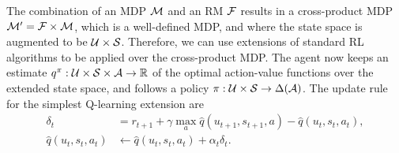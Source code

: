 The combination of an MDP $\mathcal{M}$ and an RM $\mathcal{F}$ results in a cross-product MDP $\mathcal{M}'=\mathcal{F}\times\mathcal{M}$, which is a well-defined MDP, and where the state space is augmented to be $\mathcal{U}\times\mathcal{S}$. Therefore, we can use extensions of standard RL algorithms to be applied over the cross-product MDP. The agent now keeps an estimate $q^\pi:\mathcal{U}\times\mathcal{S}\times\mathcal{A}\rightarrow\mathbb{R}$ of the optimal action-value functions over the extended state space, and follows a policy $\pi:\mathcal{U}\times\mathcal{S}\rightarrow\Delta(\mathcal{A})$. The update rule for the simplest Q-learning extension are
\begin{align}
  \delta_t &= r_{t+1} + \gamma \max_a \widehat q(u_{t+1}, s_{t+1}, a) - \widehat q(u_t, s_t, a_t),\\ 
  \widehat q(u_t,s_t,a_t) &\gets \widehat q(u_t,s_t,a_t) + \alpha_t \delta_t.
  \label{eq:qlearning_rm}
\end{align}
 


